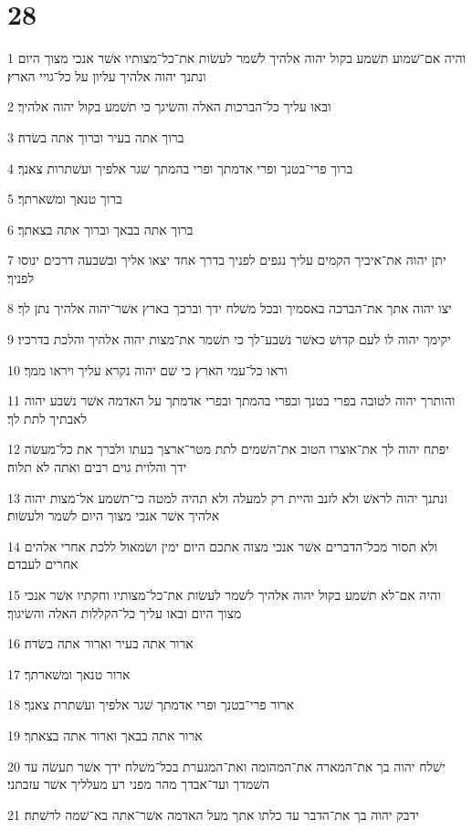 \chapter{28}

\par 1 והיה אם־שׁמוע תשׁמע בקול יהוה אלהיך לשׁמר לעשׂות את־כל־מצותיו אשׁר אנכי מצוך היום ונתנך יהוה אלהיך עליון על כל־גויי הארץ׃
\par 2 ובאו עליך כל־הברכות האלה והשׂיגך כי תשׁמע בקול יהוה אלהיך׃
\par 3 ברוך אתה בעיר וברוך אתה בשׂדה׃
\par 4 ברוך פרי־בטנך ופרי אדמתך ופרי בהמתך שׁגר אלפיך ועשׁתרות צאנך׃
\par 5 ברוך טנאך ומשׁארתך׃
\par 6 ברוך אתה בבאך וברוך אתה בצאתך׃
\par 7 יתן יהוה את־איביך הקמים עליך נגפים לפניך בדרך אחד יצאו אליך ובשׁבעה דרכים ינוסו לפניך׃
\par 8 יצו יהוה אתך את־הברכה באסמיך ובכל משׁלח ידך וברכך בארץ אשׁר־יהוה אלהיך נתן לך׃
\par 9 יקימך יהוה לו לעם קדושׁ כאשׁר נשׁבע־לך כי תשׁמר את־מצות יהוה אלהיך והלכת בדרכיו׃
\par 10 וראו כל־עמי הארץ כי שׁם יהוה נקרא עליך ויראו ממך׃
\par 11 והותרך יהוה לטובה בפרי בטנך ובפרי בהמתך ובפרי אדמתך על האדמה אשׁר נשׁבע יהוה לאבתיך לתת לך׃
\par 12 יפתח יהוה לך את־אוצרו הטוב את־השׁמים לתת מטר־ארצך בעתו ולברך את כל־מעשׂה ידך והלוית גוים רבים ואתה לא תלוה׃
\par 13 ונתנך יהוה לראשׁ ולא לזנב והיית רק למעלה ולא תהיה למטה כי־תשׁמע אל־מצות יהוה אלהיך אשׁר אנכי מצוך היום לשׁמר ולעשׂות׃
\par 14 ולא תסור מכל־הדברים אשׁר אנכי מצוה אתכם היום ימין ושׂמאול ללכת אחרי אלהים אחרים לעבדם׃
\par 15 והיה אם־לא תשׁמע בקול יהוה אלהיך לשׁמר לעשׂות את־כל־מצותיו וחקתיו אשׁר אנכי מצוך היום ובאו עליך כל־הקללות האלה והשׂיגוך׃
\par 16 ארור אתה בעיר וארור אתה בשׂדה׃
\par 17 ארור טנאך ומשׁארתך׃
\par 18 ארור פרי־בטנך ופרי אדמתך שׁגר אלפיך ועשׁתרת צאנך׃
\par 19 ארור אתה בבאך וארור אתה בצאתך׃
\par 20 ישׁלח יהוה בך את־המארה את־המהומה ואת־המגערת בכל־משׁלח ידך אשׁר תעשׂה עד השׁמדך ועד־אבדך מהר מפני רע מעלליך אשׁר עזבתני׃
\par 21 ידבק יהוה בך את־הדבר עד כלתו אתך מעל האדמה אשׁר־אתה בא־שׁמה לרשׁתה׃

